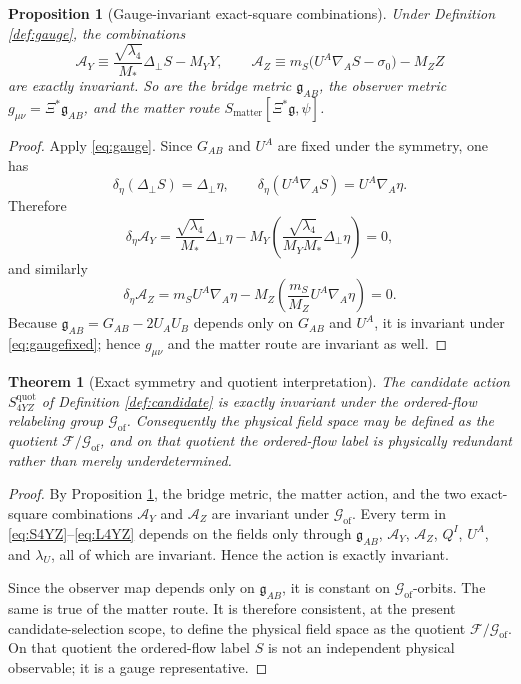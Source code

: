 \documentclass[11pt]{article}
\newcommand{\BridgeMetric}{\mathfrak{g}}
\newcommand{\AY}{\mathcal A_Y}
\newcommand{\AZ}{\mathcal A_Z}
\newcommand{\FieldSpace}{\mathscr F}
\newcommand{\GaugeGroup}{\mathscr G_{\mathrm{of}}}
\newtheorem{proposition}{Proposition}
\newtheorem{theorem}{Theorem}
\begin{document}
\begin{proposition}[Gauge-invariant exact-square combinations]
\label{prop:invariants}
Under Definition \ref{def:gauge}, the combinations
\begin{equation}
\AY
\equiv
\frac{\sqrt{\lambda_4}}{M_*}\Delta_\perp S-M_YY,
\qquad
\AZ
\equiv
m_S\bigl(U^A\nabla_A S-\sigma_0\bigr)-M_ZZ
\label{eq:AYAZ}
\end{equation}
are exactly invariant. So are the bridge metric \(\BridgeMetric_{AB}\), the observer metric \(g_{\mu\nu}=\Xi^*\BridgeMetric_{AB}\), and the matter route \(S_{\mathrm{matter}}[\Xi^*\BridgeMetric,\psi]\).
\end{proposition}

\begin{proof}
Apply \eqref{eq:gauge}. Since \(G_{AB}\) and \(U^A\) are fixed under the symmetry, one has
\[
\delta_\eta\!\left(\Delta_\perp S\right)=\Delta_\perp\eta,
\qquad
\delta_\eta\!\left(U^A\nabla_A S\right)=U^A\nabla_A\eta.
\]
Therefore
\[
\delta_\eta \AY
=
\frac{\sqrt{\lambda_4}}{M_*}\Delta_\perp\eta
-M_Y
\left(
\frac{\sqrt{\lambda_4}}{M_YM_*}\Delta_\perp\eta
\right)
=0,
\]
and similarly
\[
\delta_\eta \AZ
=
m_S U^A\nabla_A\eta
-M_Z
\left(
\frac{m_S}{M_Z}U^A\nabla_A\eta
\right)
=0.
\]
Because \(\BridgeMetric_{AB}=G_{AB}-2U_AU_B\) depends only on \(G_{AB}\) and \(U^A\), it is invariant under \eqref{eq:gaugefixed}; hence \(g_{\mu\nu}\) and the matter route are invariant as well.
\end{proof}

\begin{theorem}[Exact symmetry and quotient interpretation]
\label{thm:symmetry}
The candidate action \(S_{4YZ}^{\mathrm{quot}}\) of Definition \ref{def:candidate} is exactly invariant under the ordered-flow relabeling group \(\GaugeGroup\). Consequently the physical field space may be defined as the quotient \(\FieldSpace/\GaugeGroup\), and on that quotient the ordered-flow label is physically redundant rather than merely underdetermined.
\end{theorem}

\begin{proof}
By Proposition \ref{prop:invariants}, the bridge metric, the matter action, and the two exact-square combinations \(\AY\) and \(\AZ\) are invariant under \(\GaugeGroup\). Every term in \eqref{eq:S4YZ}--\eqref{eq:L4YZ} depends on the fields only through \(\BridgeMetric_{AB}\), \(\AY\), \(\AZ\), \(Q^I\), \(U^A\), and \(\lambda_U\), all of which are invariant. Hence the action is exactly invariant.

Since the observer map depends only on \(\BridgeMetric_{AB}\), it is constant on \(\GaugeGroup\)-orbits. The same is true of the matter route. It is therefore consistent, at the present candidate-selection scope, to define the physical field space as the quotient \(\FieldSpace/\GaugeGroup\). On that quotient the ordered-flow label \(S\) is not an independent physical observable; it is a gauge representative.
\end{proof}
\end{document}
